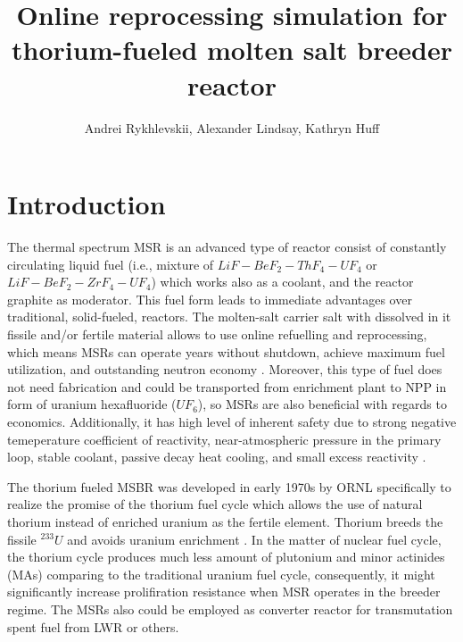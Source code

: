 \documentclass{anstrans}
\title{Online reprocessing simulation for thorium-fueled molten salt breeder reactor}
\author{Andrei Rykhlevskii, Alexander Lindsay, Kathryn Huff}
\institute{
Department of Nuclear, Plasma, and Radiological Engineering, University of Illinois at Urbana-Champaign \break
Urbana, IL
}
\begin{document}
\section{Introduction}
The thermal spectrum \gls{MSR} is an advanced type of reactor consist of constantly circulating liquid fuel (i.e., mixture of $LiF-BeF_2-ThF_4-UF_4$ or $LiF-BeF_2-ZrF_4-UF_4$) which works also as a coolant, and the reactor graphite as moderator. This fuel form leads to immediate advantages over traditional, solid-fueled, reactors. The molten-salt carrier salt with dissolved in it fissile and/or fertile material allows to use online refuelling and reprocessing, which means \gls{MSR}s can operate years without shutdown, achieve maximum fuel utilization, and outstanding neutron economy \cite{leblanc_molten_2010}. Moreover, this type of fuel does not need fabrication and could be transported from enrichment plant to \gls{NPP} in form of uranium hexafluoride ($UF_6$), so \gls{MSR}s are also beneficial with regards to economics. Additionally, it has high level of inherent safety due to strong negative temeperature coefficient of reactivity, near-atmospheric pressure in the primary loop, stable coolant, passive decay heat cooling, and small excess reactivity \cite{elsheikh_safety_2013}.

The thorium fueled \gls{MSBR} was developed in early 1970s by \gls{ORNL} specifically to realize the promise of the thorium fuel cycle which allows the use of natural thorium instead of enriched uranium as the fertile element. Thorium breeds the fissile $^{233}U$ and avoids uranium enrichment \cite{robertson_conceptual_1971}. In the matter of nuclear fuel cycle, the thorium cycle produces much less amount of plutonium and minor actinides (MAs) comparing to the traditional uranium fuel cycle, consequently, it might significantly increase prolifiration resistance when \gls{MSR} operates in the breeder regime. The \gls{MSR}s also could be employed as converter reactor for transmutation spent fuel from \gls{LWR} or others.
\end{document}
